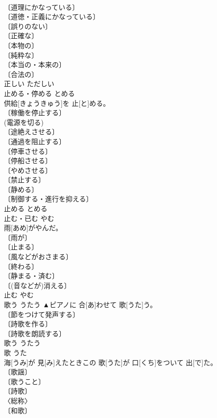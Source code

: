 \documentclass[8pt]{extreport}
\begin{document}
\begin{CJK}{UTF8}{min}
\\	〔道理にかなっている〕 
\\	〔道徳・正義にかなっている〕 
\\	〔誤りのない〕 
\\	〔正確な〕 
\\	〔本物の〕 
\\	〔純粋な〕 
\\	〔本当の・本来の〕 
\\	〔合法の〕 
\\	正しい	ただしい	
\\	止める・停める	とめる	
\\	供給[きょうきゅう]を 止[と]める。	
\\	〔稼働を停止する〕 
\\	(電源を切る) 
\\	〔途絶えさせる〕 
\\	〔通過を阻止する〕 
\\	〔停車させる〕 
\\	〔停船させる〕 
\\	〔やめさせる〕 
\\	〔禁止する〕 
\\	〔静める〕 
\\	〔制御する・進行を抑える〕 
\\	止める	とめる	
\\	止む・已む	やむ	
\\	雨[あめ]がやんだ。	
\\	〔雨が〕 
\\	〔止まる〕 
\\	〔風などがおさまる〕 
\\	〔終わる〕 
\\	〔静まる・済む〕 
\\	〔(音などが)消える〕 
\\	止む	やむ	
\\	歌う	うたう	▲ピアノに 合[あ]わせて 歌[うた]う。	
\\	〔節をつけて発声する〕 
\\	〔詩歌を作る〕 
\\	〔詩歌を朗読する〕 
\\	歌う	うたう	
\\	歌	うた	
\\	海[うみ]が 見[み]えたときこの 歌[うた]が 口[くち]をついて 出[で]た。	
\\	〔歌謡〕 
\\	〔歌うこと〕 
\\	〔詩歌〕 
\\	〈総称〉 
\\	〔和歌〕 

\end{CJK}
\end{document}
